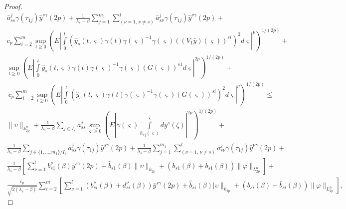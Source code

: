 \begin{proof}
\begin{multline}
        \bar a^{j}_{ss} \gamma (\tau _{1j})\hat y^{s\gamma}(2p)+
        \frac{1}{\lambda _s -
        \beta}\sum\limits_{j=1}^{m_1}\sum\limits_{(\nu=1,\, \nu \neq s )}^l
        \bar a^{j}_{s\nu}\gamma (\tau _{1j})\hat y^{\nu\gamma}(2p)
        +\\
        c_p\sum \limits_{i=2}^{m}\mathrel {\mathop {\sup}\limits _{t\geq 0}}
        \left (E \left |\int \limits _0^t (\hat y_s(t,\varsigma)\gamma
        (t)\gamma (\varsigma )^{-1}\gamma (\varsigma)((V_1\bar
        y)(\varsigma))^{si})^2d \varsigma \right
        |^{p}\right )^{1/(2p)}  + \\
        \mathrel {\mathop {\sup} \limits _{t \geq 0}} \left (E\left |\int
        \limits _0^t \hat y_s(t,\varsigma)\gamma (t)\gamma (\varsigma
        )^{-1}\gamma
        (\varsigma)(G(\varsigma))^{s1}d\varsigma \right |^{2p}\right )^{1/(2p)} + \\
        \ c_p\sum \limits_{i=2}^{m}\mathrel {\mathop {\sup}\limits _{t \geq
        0}} \left (E \left |\int \limits _0^t (\hat y_s(t,\varsigma)\gamma
        (t)\gamma (\varsigma )^{-1}\gamma (\varsigma)(G(\varsigma))^{si})^2d
        \varsigma
        \right |^{p}\right )^{1/(2p)}   \leq  \\
        \|\upsilon \|_{k^n_{2p}} + \frac{1}{\lambda _s - \beta} \sum
        \limits_{j \in I_s} \bar a^{j}_{ss}
         \mathrel {\mathop {\sup}
        \limits _{\varsigma \geq 0}} \left (E\left |\gamma (\varsigma )\int
        \limits_{h_{1j}(\varsigma)}^\varsigma
        d\bar y^s(\zeta )\right |^{2p}\right )^{1/(2p)}   +  \\
        \frac{1}{\lambda _s - \beta}\sum \limits_{j \in\{1,\dots,m_1\} / I_s}
        \bar a^{j}_{ss} \gamma (\tau _{1j})\hat y^{s\gamma}(2p)+
        \frac{1}{\lambda _s - \beta}\sum\limits_{j=1}^{m_1}\sum\limits_{(\nu
        =1,\, \nu \neq s )}^l \bar a^{j}_{s\nu}\gamma (\tau _{1j})\hat
        y^{\nu\gamma}(2p)
        +\\
        \frac{1}{\lambda _s -\beta } \left [\sum\limits_{\nu =1}^{l} b^\nu
        _{s1}(\beta)\bar y^{s\gamma}(2p) +
         \hat b_{s1}(\beta)
        \|\upsilon\|_{k_{2p}} +( b_{s1}(\beta) +\bar b_{s1}(\beta)
        )\|\varphi \|_{L^n_{2p}}\right ]
        +\\
        \frac{c_p}{\sqrt{2(\lambda _s -\beta )}} \sum \limits_{i=2}^{m}
        \left [\sum \limits_{\nu=1}^{l}(b^\nu_{si}(\beta) +
        d^\nu_{si}(\beta))\bar y^{s\gamma}(2p) + \hat b_{si}(\beta)
        |\upsilon\|_{k_{2p}} +( b_{si}(\beta) +\bar b_{si}(\beta ))\|\varphi
        \|_{L^n_{2p}}\right ],

\end{multline}
\end{proof}
